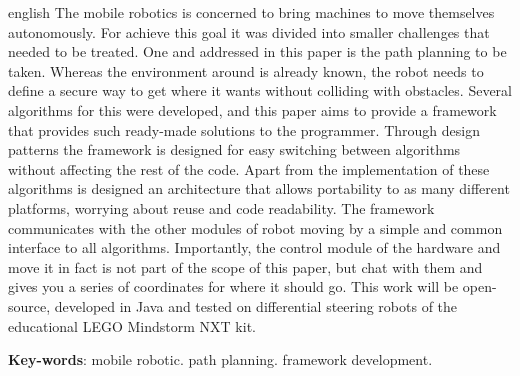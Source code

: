 \begin{resumo}[Abstract]
 \begin{otherlanguage*}{english}
   The mobile robotics is concerned to bring machines to move themselves autonomously. For achieve this goal it was divided into smaller challenges that needed to be treated. One and addressed in this paper is the path planning to be taken. Whereas the environment around is already known, the robot needs to define a secure way to get where it wants without colliding with obstacles. Several algorithms for this were developed, and this paper aims to provide a framework that provides such ready-made solutions to the programmer. Through design patterns the framework is designed for easy switching between algorithms without affecting the rest of the code. Apart from the implementation of these algorithms is designed an architecture that allows portability to as many different platforms, worrying about reuse and code readability. The framework communicates with the other modules of robot moving by a simple and common interface to all algorithms. Importantly, the control module of the hardware and move it in fact is not part of the scope of this paper, but chat with them and gives you a series of coordinates for where it should go. This work will be open-source, developed in Java and tested on differential steering robots of the educational LEGO Mindstorm NXT kit.

   \vspace{\onelineskip}
 
   \noindent 
   \textbf{Key-words}: mobile robotic. path planning. framework development.
 \end{otherlanguage*}
\end{resumo}
